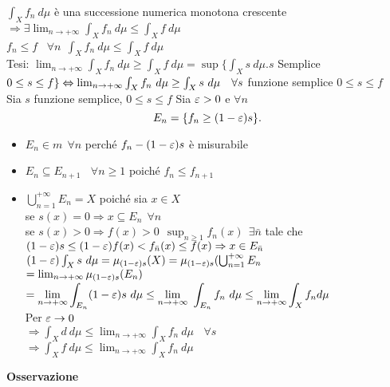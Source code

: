 \documentclass[12px]{article}
\begin{document}
		\begin{dimo}
			$\int_X f_n\ d\mu$ è una successione numerica monotona crescente \\
			$ \Rightarrow  \exists \lim_{n \rightarrow +\infty} \int_X f_n\ d\mu \leq \int_X f\ d\mu$ \\
			$f_n \leq f$ \  $\forall n\ \ \int_X f_n\ d\mu\leq \int_X f \ d\mu$  \\
			Tesi: $\lim_{n \rightarrow +\infty}\int_X f_n \ d\mu \geq \int_X f\ d \mu = \sup\{\int_X s\ d\mu. s$ Semplice $0\leq s \leq f\}\\
			\Leftrightarrow \lim_{ n \rightarrow +\infty} \int_X f_n \ d\mu \geq \int_X s \ d\mu \ \ \ \forall s$ funzione semplice $0\leq s\leq f$\\
			Sia  $s$ funzione semplice, $0\leq s\leq f$ Sia  $\varepsilon > 0 $ e $\forall n$
			 \[
				 E_n = \{ f_n\geq (1-\varepsilon)s\}
			.\] 
			\begin{itemize}
				\item $E_n\in m \ \ \forall n$ perché $f_n - (1-\varepsilon)s$ è misurabile
				\item $E_n\subseteq E_{n+1}\ \ \ \ \forall n \geq 1$ poiché  $f_n\leq f_{n+1}$
				\item  $ \bigcup^{+\infty}_{n = 1}E_n = X$ poiché sia $x\in X$\\
se  $s(x) = 0 \Rightarrow x\subseteq E_n \ \ \forall n$\\
se $s(x) > 0 \Rightarrow f(x) > 0 \ \ \sup_{n\geq 1} f_n(x) \ \ \exists \bar n$ tale che \\
$(1-\varepsilon)s\leq (1-\varepsilon) f(x) < f_{\bar n} (x)\leq f(x) \Rightarrow x\in E_{\bar n}$ \\
$(1-\varepsilon)\int_X s \ d\mu = \mu_{(1-\varepsilon)s}(X) = \mu_{(1-\varepsilon)s} ( \bigcup^{+\infty}_{n = 1}E_n$\\
$ = \lim_{n \rightarrow+\infty} \mu_{(1-\varepsilon)s}(E_n)$\\
$\displaystyle = \lim_{n \rightarrow +\infty} \int_{E_n} (1-\e)s \ d\mu \leq \lim_{ n \rightarrow +\infty} \ \int_{E_n} f_n \ d\mu \leq \lim_{n \rightarrow +\infty}\int_X f_n d\mu$\\
Per $\varepsilon \rightarrow 0$\\
$ \Rightarrow \int_X d\ d\mu \leq \lim_{n \rightarrow +\infty}\int_X f_n\ d\mu \ \ \ \ \forall s$ \\
$ \Rightarrow  \int_X f \ d\mu\leq \lim_{n \rightarrow +\infty}\int_X f_n \ d\mu$
			\end{itemize}
		
		\end{dimo}
		\textbf{Osservazione}\\
\end{document}
